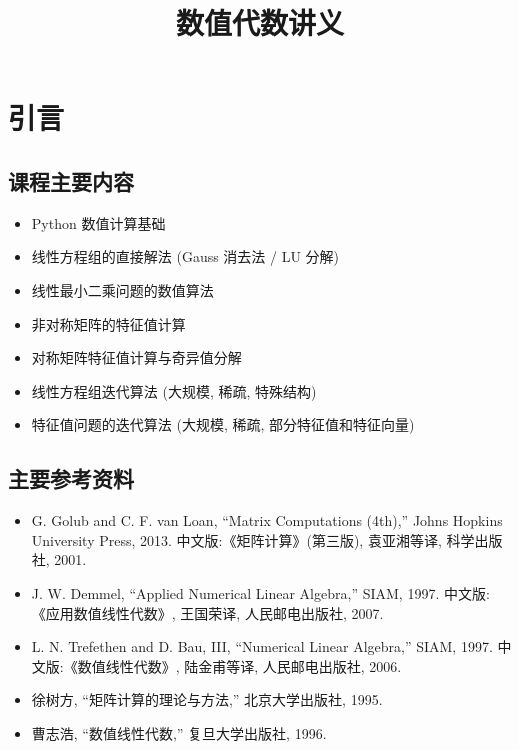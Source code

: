 \documentclass{book}
\begin{document}
\title{数值代数讲义}
\maketitle

\chapter{引言}

\section{课程主要内容}
\begin{itemize}
    \item Python 数值计算基础
    \item 线性方程组的直接解法 (Gauss 消去法 / LU 分解)
    \item 线性最小二乘问题的数值算法
    \item 非对称矩阵的特征值计算
    \item 对称矩阵特征值计算与奇异值分解
    \item 线性方程组迭代算法 (大规模, 稀疏, 特殊结构)
    \item 特征值问题的迭代算法 (大规模, 稀疏, 部分特征值和特征向量)
\end{itemize}

\section{主要参考资料}

\begin{itemize}
    \item G. Golub and C. F. van Loan, “Matrix Computations (4th),” Johns Hopkins University Press, 2013.
中文版:《矩阵计算》(第三版), 袁亚湘等译, 科学出版社, 2001.
\item J. W. Demmel, “Applied Numerical Linear Algebra,” SIAM, 1997.
中文版:《应用数值线性代数》, 王国荣译, 人民邮电出版社, 2007.
\item L. N. Trefethen and D. Bau, III, “Numerical Linear Algebra,” SIAM, 1997.
中文版:《数值线性代数》, 陆金甫等译, 人民邮电出版社, 2006.
\item 徐树方, “矩阵计算的理论与方法,” 北京大学出版社, 1995.
\item 曹志浩, “数值线性代数,” 复旦大学出版社, 1996.
\end{itemize}
\end{document}
